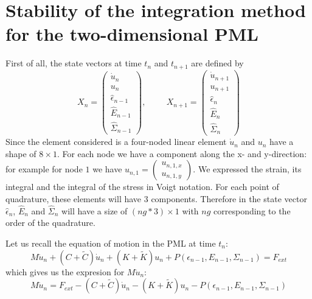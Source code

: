 \section{Stability of the integration method for the two-dimensional PML}
First of all, the state vectors at time $t_n$ and $t_{n+1}$ are defined by
\begin{equation}
X_n = \begin{pmatrix}
\dot{u}_n \\
u_n \\
\hat{\epsilon}_{n-1} \\
\hat{E}_{n-1} \\
\hat{\Sigma}_{n-1}
\end{pmatrix}, \hspace{1cm}
X_{n+1}= \begin{pmatrix}
\dot{u}_{n+1} \\
u_{n+1} \\
\hat{\epsilon}_{n} \\
\hat{E}_{n} \\
\hat{\Sigma}_{n}
\end{pmatrix}
\end{equation}  
Since the element considered is a four-noded linear element $\dot{u}_n$ and $u_n$ have a shape of $8 \times 1$. For each node we have a component along the x- and y-direction: for example for node $1$ we have $u_{n,1} = \begin{pmatrix}
u_{n,1,x}\\ u_{n,1,y}
\end{pmatrix} $. We expressed the strain, its integral and the integral of the stress in Voigt notation. For each point of quadrature, these elements will have $3$ components. Therefore in the state vector $\hat{\epsilon}_{n}$, $\hat{E}_{n}$ and $\hat{\Sigma}_{n}$ will have a size of $(ng*3) \times 1$ with $ng$ corresponding to the order of the quadrature.   
\par Let us recall the equation of motion in the PML at time $t_n$:
\begin{equation}
M \ddot{u}_n +\left(C+\tilde{C}\right)\dot{u}_n 
+\left(K+\tilde{K}\right)u_n + P(\epsilon_{n-1},E_{n-1},\Sigma_{n-1}) = F_{ext}
\label{eq:motion-pml-tn}
\end{equation}
which gives us the expresion for $M\ddot{u}_n$:
\begin{equation}
M \ddot{u}_n = F_{ext} -\left(C+\tilde{C}\right)\dot{u}_n 
-\left(K+\tilde{K}\right)u_n - P(\epsilon_{n-1},E_{n-1},\Sigma_{n-1})
\label{eq:motion-pml-tn-reorganized}
\end{equation}

